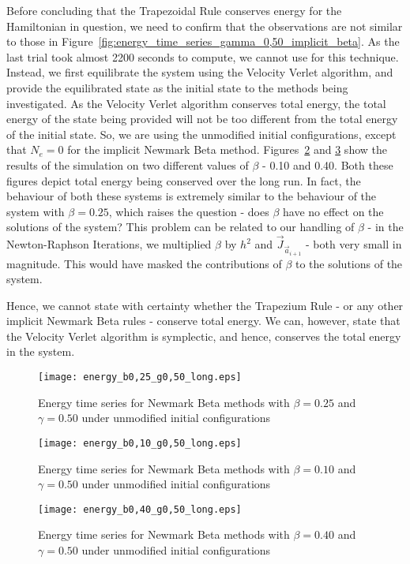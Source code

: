 \documentclass[../Main.tex]{subfiles}
\begin{document}
Before concluding that the Trapezoidal Rule conserves energy for the Hamiltonian in question, we need to confirm that the observations are not similar to those in Figure~\ref{fig:energy_time_series_gamma_0,50_implicit_beta}. As the last trial took almost 2200 seconds to compute, we cannot use for this technique. Instead, we first equilibrate the system using the Velocity Verlet algorithm, and provide the equilibrated state as the initial state to the methods being investigated. As the Velocity Verlet algorithm conserves total energy, the total energy of the state being provided will not be too different from the total energy of the initial state. So, we are using the unmodified initial configurations, except that $N_{e} = 0$ for the implicit Newmark Beta method. Figures~\ref{fig:energy_time_series_beta_0,10_gamma_0,50_long} and \ref{fig:energy_time_series_beta_0,40_gamma_0,50_long} show the results of the simulation on two different values of $\beta$ - 0.10 and 0.40. Both these figures depict total energy being conserved over the long run. In fact, the behaviour of both these systems is extremely similar to the behaviour of the system with $\beta = 0.25$, which raises the question - does $\beta$ have no effect on the solutions of the system? This problem can be related to our handling of $\beta$ - in the Newton-Raphson Iterations, we multiplied $\beta$ by $h^{2}$ and $\vec{J}_{\vec{a}_{i+1}}$ - both very small in magnitude. This would have masked the contributions of $\beta$ to the solutions of the system.

Hence, we cannot state with certainty whether the Trapezium Rule - or any other implicit Newmark Beta rules - conserve total energy. We can, however, state that the Velocity Verlet algorithm is symplectic, and hence, conserves the total energy in the system. 
\begin{figure}[H]
\centering
\texttt{[image: energy\_b0,25\_g0,50\_long.eps]}
\caption{Energy time series for Newmark Beta methods with $\beta = 0.25$  and $\gamma = 0.50$ under unmodified initial configurations}
\label{fig:energy_time_series_beta_0,25_gamma_0,50_long}
\end{figure}

\begin{figure}[H]
\centering
\texttt{[image: energy\_b0,10\_g0,50\_long.eps]}
\caption{Energy time series for Newmark Beta methods with $\beta = 0.10$  and $\gamma = 0.50$ under unmodified initial configurations}
\label{fig:energy_time_series_beta_0,10_gamma_0,50_long}
\end{figure}

\begin{figure}[H]
\centering
\texttt{[image: energy\_b0,40\_g0,50\_long.eps]}
\caption{Energy time series for Newmark Beta methods with $\beta = 0.40$  and $\gamma = 0.50$ under unmodified initial configurations}
\label{fig:energy_time_series_beta_0,40_gamma_0,50_long}
\end{figure}
\centering
\end{document}
